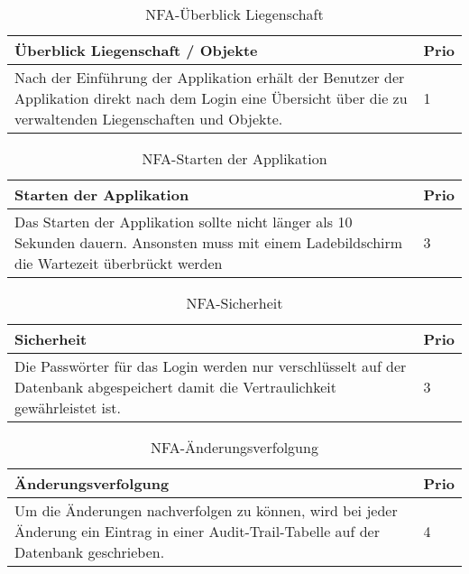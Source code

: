 \begin{table}[H]
  \centering
  \settowidth{}
  \setlength\extrarowheight{2pt}
  \begin{tabulary}{1.0\textwidth}{|m{16cm}|L|}
    \hline
    \textbf{Überblick Liegenschaft / Objekte}&\textbf{Prio}\\
    \hline
    Nach der Einführung der Applikation erhält der Benutzer der Applikation direkt nach dem Login eine Übersicht über die zu verwaltenden Liegenschaften und Objekte. & 1\\ 
    \hline
  \end{tabulary}
  \caption{NFA-Überblick Liegenschaft}
  \label{NFAueberblick}
\end{table}

\begin{table}[H]
  \centering
  \settowidth{}
  \setlength\extrarowheight{2pt}
  \begin{tabulary}{1.0\textwidth}{|m{16cm}|L|}
    \hline
    \textbf{Starten der Applikation}&\textbf{Prio}\\
    \hline
    Das Starten der Applikation sollte nicht länger als 10 Sekunden dauern. Ansonsten muss mit einem Ladebildschirm die Wartezeit überbrückt werden & 3\\ 
    \hline
  \end{tabulary}
  \caption{NFA-Starten der Applikation}
  \label{NFAStarten}
\end{table}

\begin{table}[H]
  \centering
  \settowidth{}
  \setlength\extrarowheight{2pt}
  \begin{tabulary}{1.0\textwidth}{|m{16cm}|L|}
    \hline
    \textbf{Sicherheit}&\textbf{Prio}\\
    \hline
    Die Passwörter für das Login werden nur verschlüsselt auf der Datenbank abgespeichert damit die Vertraulichkeit gewährleistet ist. & 3\\ 
    \hline
  \end{tabulary}
  \caption{NFA-Sicherheit}
  \label{NFASicherheit}
\end{table}

\begin{table}[H]
  \centering
  \settowidth{}
  \setlength\extrarowheight{2pt}
  \begin{tabulary}{1.0\textwidth}{|m{16cm}|L|}
    \hline
    \textbf{Änderungsverfolgung}&\textbf{Prio}\\
    \hline
     Um die Änderungen nachverfolgen zu können, wird bei jeder Änderung ein Eintrag in einer Audit-Trail-Tabelle auf der Datenbank geschrieben. & 4\\
    \hline
  \end{tabulary}
  \caption{NFA-Änderungsverfolgung}
  \label{NFAAenderungsverfolgung}
\end{table}